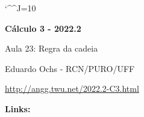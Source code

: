 \documentclass[oneside,12pt]{article}
\begin{document}
\catcode`\^^J=10
\pu
\def\pictgridstyle{\color{GrayPale}\linethickness{0.3pt}}
\def\pictaxesstyle{\linethickness{0.5pt}}
\def\pictnaxesstyle{\color{GrayPale}\linethickness{0.5pt}}
\celllower=2.5pt


\def\u#1{\par{\footnotesize \url{#1}}}

\def\drafturl{http://angg.twu.net/LATEX/2022-2-C3.pdf}
\def\drafturl{http://angg.twu.net/2022.2-C3.html}
\def\draftfooter{\tiny \href{\drafturl}{\jobname{}} \ColorBrown{\shorttoday{} \hours}}



%

\thispagestyle{empty}

\begin{center}

\vspace*{1.2cm}

{\bf \Large Cálculo 3 - 2022.2}

\bsk

Aula 23: Regra da cadeia

\bsk

Eduardo Ochs - RCN/PURO/UFF

\url{http://angg.twu.net/2022.2-C3.html}

\end{center}

\newpage


{\bf Links:}

\end{document}
